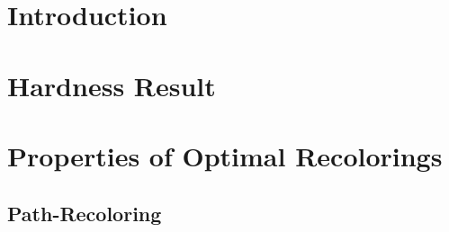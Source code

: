 \section{Introduction}

\section{Hardness Result}


\section{Properties of Optimal Recolorings}

	\subsection{Path-Recoloring}



% 
